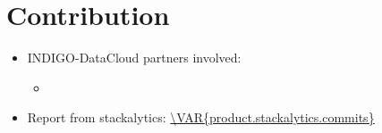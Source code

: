 \documentclass[a4wide,11pt]{article}
\begin{document}
\section{Contribution}
\begin{itemize}
    \item INDIGO-DataCloud partners involved:
    \begin{itemize}
            \item \texttt{}
    \end{itemize}
    \item Report from stackalytics: \url{\VAR{product.stackalytics.commits}}
\end{itemize}


\newpage

\end{document}
